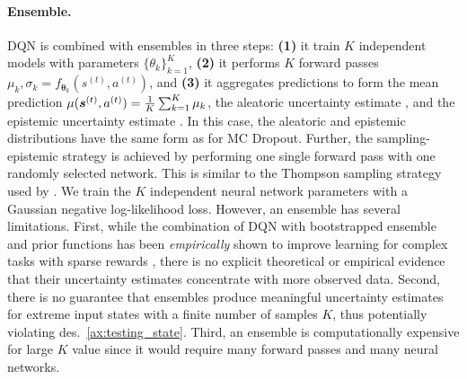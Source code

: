 \paragraph{Ensemble.} DQN is combined with ensembles \citep{ensembles} in three steps: \textbf{(1)} it train $K$ independent models with parameters $\{\theta_k\}_{k=1}^K$, \textbf{(2)} it performs $K$ forward passes $\mu_k, \sigma_k = f_{\bm{\theta}_k}(s^{(t)}, a^{(t)})$, and \textbf{(3)} it aggregates predictions to form the mean prediction $\mu(\bm{s}^{(t)}, a^{(t)}) = \frac{1}{K}\sum_{k=1}^K \mu_k$, the aleatoric uncertainty estimate , and the epistemic uncertainty estimate . In this case, the aleatoric and epistemic distributions have the same form as for MC Dropout. Further, the sampling-epistemic strategy is achieved by performing one single forward pass with one randomly selected network. This is similar to the Thompson sampling strategy used by \citet{bootstrapped-dqn}. We train the $K$ independent neural network parameters  with a Gaussian negative log-likelihood loss. However, an ensemble has several limitations. First, while the combination of DQN with bootstrapped ensemble and prior functions has been \emph{empirically} shown to improve learning for complex tasks with sparse rewards \citep{bootstrapped-dqn, randomized-prior-functions}, there is no explicit theoretical or empirical evidence that their uncertainty estimates concentrate with more observed data. Second, there is no guarantee that ensembles produce meaningful uncertainty estimates for extreme input states with a finite number of samples $K$, thus potentially violating des.~\ref{ax:testing_state}. Third, an ensemble is computationally expensive for large $K$ value since it would require many forward passes and many neural networks.


